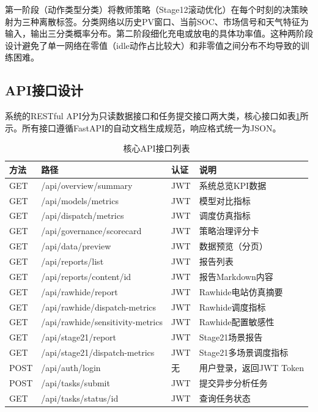 \documentclass[12pt,a4paper]{ctexbook}
\begin{document}
第一阶段（动作类型分类）将教师策略（Stage12滚动优化）在每个时刻的决策映射为三种离散标签。分类网络以历史PV窗口、当前SOC、市场信号和天气特征为输入，输出三分类概率分布。第二阶段细化充电或放电的具体功率值。这种两阶段设计避免了单一网络在零值（idle动作占比较大）和非零值之间分布不均导致的训练困难。

\subsection{API接口设计}

系统的RESTful API分为只读数据接口和任务提交接口两大类，核心接口如表\ref{tab:api}所示。所有接口遵循FastAPI的自动文档生成规范，响应格式统一为JSON。\cite{fastapi}

\begin{table}[H]
\centering
\caption{核心API接口列表}
\label{tab:api}
\begin{tabular}{@{}lllp{4cm}@{}}
\toprule
\textbf{方法} & \textbf{路径} & \textbf{认证} & \textbf{说明} \\
\midrule
GET  & /api/overview/summary     & JWT & 系统总览KPI数据 \\
GET  & /api/models/metrics       & JWT & 模型对比指标 \\
GET  & /api/dispatch/metrics     & JWT & 调度仿真指标 \\
GET  & /api/governance/scorecard & JWT & 策略治理评分卡 \\
GET  & /api/data/preview         & JWT & 数据预览（分页） \\
GET  & /api/reports/list         & JWT & 报告列表 \\
GET  & /api/reports/content/{id} & JWT & 报告Markdown内容 \\
GET  & /api/rawhide/report       & JWT & Rawhide电站仿真摘要 \\
GET  & /api/rawhide/dispatch-metrics & JWT & Rawhide调度指标 \\
GET  & /api/rawhide/sensitivity-metrics & JWT & Rawhide配置敏感性 \\
GET  & /api/stage21/report       & JWT & Stage21场景报告 \\
GET  & /api/stage21/dispatch-metrics & JWT & Stage21多场景调度指标 \\
POST & /api/auth/login           & 无   & 用户登录，返回JWT Token \\
POST & /api/tasks/submit         & JWT & 提交异步分析任务 \\
GET  & /api/tasks/status/{id}    & JWT & 查询任务状态 \\
\bottomrule
\end{tabular}
\end{table}
\end{document}
